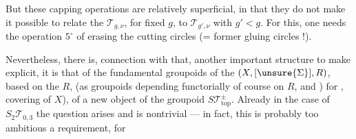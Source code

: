 But these capping operations are relatively superficial, in that they do not make it possible to relate the $\mathcal T_{g,\nu}$, for fixed $g$, to $\mathcal T_{g',\nu}$ with $g'<g$. For this, one needs the operation \textcircled{$5^\circ$} of erasing the cutting circles (= former gluing circles !).

Nevertheless, there is,   connection with that, another important structure to make explicit, it is that  of the fundamental groupoids  of the $(X,[\unsure{\Sigma}],R)$,  based on the $R$, (as groupoids depending functorially of course on $R$, and   ) for    ,   covering  of $X$), of a new object of the  groupoid $S\mathcal T_{\mathrm{top}}^\pm$. Already in the case of $S_2\mathcal T_{0,3}$ the question arises and is nontrivial --- in fact, this is probably too ambitious a requirement, for


